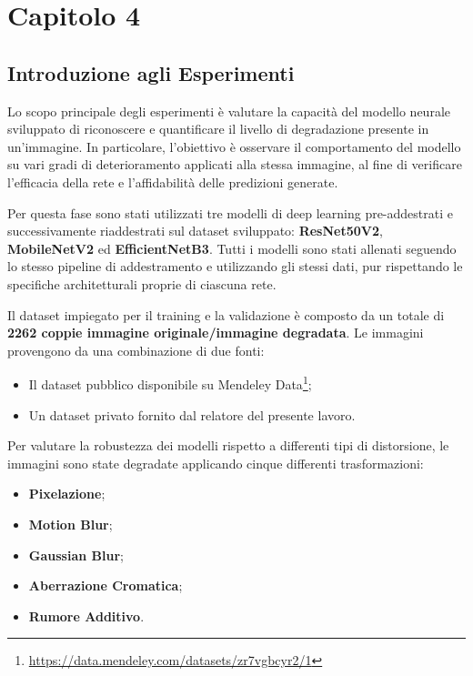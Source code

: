 %
%
\chapter{Capitolo 4}
\label{chap:esperimenti}

\section{Introduzione agli Esperimenti}

Lo scopo principale degli esperimenti è valutare la capacità del modello neurale sviluppato di riconoscere e quantificare il livello di degradazione presente in un'immagine. In particolare, l'obiettivo è osservare il comportamento del modello su vari gradi di deterioramento applicati alla stessa immagine, al fine di verificare l'efficacia della rete e l'affidabilità delle predizioni generate.

Per questa fase sono stati utilizzati tre modelli di deep learning pre-addestrati e successivamente riaddestrati sul dataset sviluppato: \textbf{ResNet50V2}, \textbf{MobileNetV2} ed \textbf{EfficientNetB3}. Tutti i modelli sono stati allenati seguendo lo stesso pipeline di addestramento e utilizzando gli stessi dati, pur rispettando le specifiche architetturali proprie di ciascuna rete.

Il dataset impiegato per il training e la validazione è composto da un totale di \textbf{2262 coppie immagine originale/immagine degradata}. Le immagini provengono da una combinazione di due fonti:
\begin{itemize}
    \item Il dataset pubblico disponibile su Mendeley Data\footnote{\url{https://data.mendeley.com/datasets/zr7vgbcyr2/1}};
    \item Un dataset privato fornito dal relatore del presente lavoro.
\end{itemize}

Per valutare la robustezza dei modelli rispetto a differenti tipi di distorsione, le immagini sono state degradate applicando cinque differenti trasformazioni:
\begin{itemize}
    \item \textbf{Pixelazione};
    \item \textbf{Motion Blur};
    \item \textbf{Gaussian Blur};
    \item \textbf{Aberrazione Cromatica};
    \item \textbf{Rumore Additivo}.
\end{itemize}

